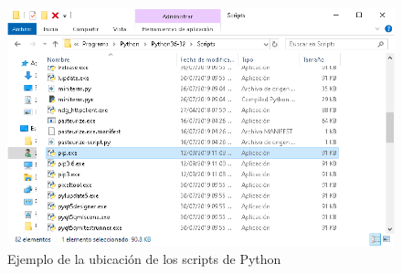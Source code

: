 \begin{figure}[H]
    \centering
    \includegraphics[scale=0.3]{imagenes/cmd/cmd_6.PNG}
    \caption{Ejemplo de la ubicaci\'on de los scripts de Python}
\end{figure}
